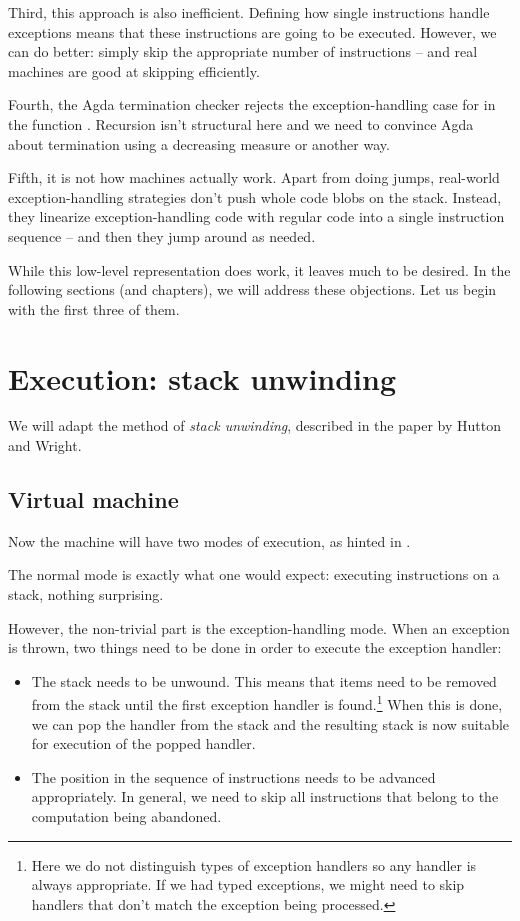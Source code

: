 Third, this approach is also inefficient. Defining how single instructions
handle exceptions means that these instructions are going to be executed.
However, we can do better: simply skip the appropriate number of instructions
-- and real machines are good at skipping efficiently.

Fourth, the Agda termination checker rejects the exception-handling case for
 in the function . Recursion isn't structural
here and we need to convince Agda about termination using a decreasing measure
or another way.

Fifth, it is not how machines actually work. Apart from doing jumps, real-world
exception-handling strategies don't push whole code blobs on the stack.
Instead, they linearize exception-handling code with regular code into a single
instruction sequence -- and then they jump around as needed.

While this low-level representation does work, it leaves much to be desired. In
the following sections (and chapters), we will address these objections. Let us
begin with the first three of them.

\section{Execution: stack unwinding}

We will adapt the method of \emph{stack unwinding}, described in the paper by Hutton
and Wright.

\subsection{Virtual machine}

Now the machine will have two modes of execution, as hinted in
\cite[p.~7]{gmh:exceptions}.

The normal mode is exactly what one would expect: executing instructions on a stack, nothing surprising.

However, the non-trivial part is the exception-handling mode. When an exception is thrown,
two things need to be done in order to execute the exception handler: \label{sec:stack-unwinding}
\begin{itemize}
	\item The stack needs to be unwound. This means that items need to be removed from the stack
		until the first exception handler is found.\footnote{Here we do not distinguish types
		of exception handlers so any handler is always appropriate. If we had typed
		exceptions, we might need to skip handlers that don't match the exception
		being processed.} When this is done, we can pop the handler from the stack
		and the resulting stack is now suitable for execution of the popped handler.
	\item The position in the sequence of instructions needs to be advanced
		appropriately. In general, we need to skip all instructions that belong
		to the computation being abandoned.
\end{itemize}


